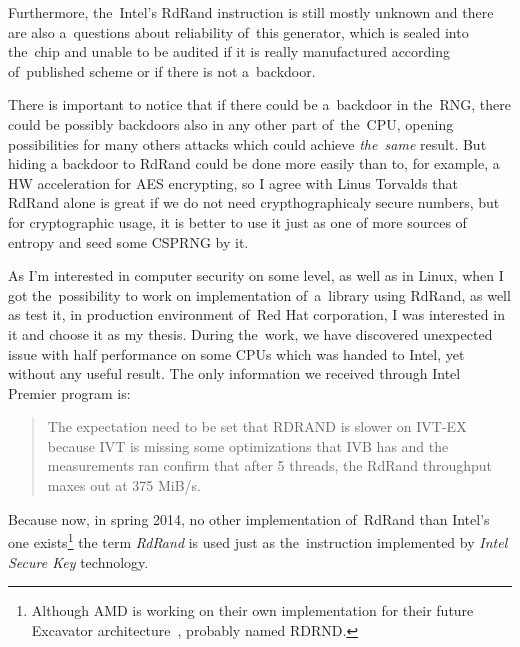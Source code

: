 Furthermore, the~Intel's RdRand instruction is still mostly unknown and there are also a~questions about reliability of~this generator, which is sealed into the~chip and unable to be audited\cite{TheodoreTsoNSA} if it is really manufactured according of~published scheme\cite{AnalysisOfDRNG} or if there is not a~backdoor. 

There is important to notice that if there could be a~backdoor in the~RNG, there could be possibly backdoors also in any other part of~the~CPU, opening possibilities for many others attacks which could achieve {\em the~same} result. But hiding a backdoor to RdRand could be done more easily than to, for example, a HW acceleration for AES encrypting, so I agree with Linus Torvalds that RdRand alone is great if we do not need crypthographicaly secure numbers, but for cryptographic usage, it is better to use it just as one of more sources of entropy and seed some CSPRNG by it.

As I'm interested in computer security on some level, as well as in Linux, 
when I got the~possibility to work on implementation of~a~library using RdRand, 
as well as test it, in production environment of~Red Hat corporation, 
I was interested in it and choose it as my thesis. 
During the~work, we have discovered unexpected issue with half performance 
on some CPUs which was handed to Intel, yet without any useful result. The only information we received through Intel Premier program is:
\begin{quote}
The expectation need to be set that RDRAND is slower on IVT-EX because IVT is missing some optimizations that IVB has and the measurements ran confirm that after 5 threads, the RdRand throughput maxes out at 375 MiB/s.
\end{quote}

Because now, in spring 2014, no other implementation of~RdRand than Intel's one exists\footnote{Although AMD is working on their own implementation for their future Excavator architecture~\cite{AMDRdRand}, probably named RDRND.}
the term {\em RdRand} is used just as the~instruction implemented by {\em Intel Secure Key} technology.



